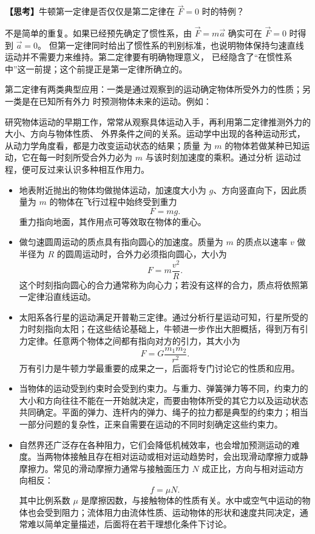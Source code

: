 \noindent\textbf{【思考】}牛顿第一定律是否仅仅是第二定律在 $\vec F=0$ 时的特例？

\begin{thinkanswer}
不是简单的重复。如果已经预先确定了惯性系，由 $\vec F=m\vec a$ 确实可在 $\vec F=0$ 时得到 $\vec a=0$。
但第一定律同时给出了惯性系的判别标准，也说明物体保持匀速直线运动并不需要力来维持。第二定律要有明确物理意义，
已经隐含了“在惯性系中”这一前提；这个前提正是第一定律所确立的。
\end{thinkanswer}

第二定律有两类典型应用：一类是通过观察到的运动确定物体所受外力的性质；另一类是在已知所有外力
时预测物体未来的运动。例如：

研究物体运动的早期工作，常常从观察具体运动入手，再利用第二定律推测外力的大小、方向与物体性质、
外界条件之间的关系。运动学中出现的各种运动形式，从动力学角度看，都是力改变运动状态的结果；质量
为 $m$ 的物体若做某种已知运动，它在每一时刻所受合外力必为 $m$ 与该时刻加速度的乘积。通过分析
运动过程，便可反过来认识多种相互作用力。
\begin{itemize}
  \item 地表附近抛出的物体均做抛体运动，加速度大小为 $g$、方向竖直向下，因此质量为 $m$ 的物体在飞行过程中始终受到重力
  \begin{equation}
    F=mg.
  \end{equation}
  重力指向地面，其作用点可等效取在物体的重心。
  \item 做匀速圆周运动的质点具有指向圆心的加速度。质量为 $m$ 的质点以速率 $v$ 做半径为 $R$ 的圆周运动时，合外力必须指向圆心，大小为
  \begin{equation}
    F=m\frac{v^2}{R}.
  \end{equation}
  这个时刻指向圆心的合力通常称为向心力；若没有这样的合力，质点将依照第一定律沿直线运动。
  \item 太阳系各行星的运动满足开普勒三定律。通过分析行星运动可知，行星所受的力时刻指向太阳；在这些结论基础上，牛顿进一步作出大胆概括，得到万有引力定律。任意两个物体之间都有指向对方的引力，其大小为
  \begin{equation}
    F=G\frac{m_1m_2}{r^2}.
  \end{equation}
  万有引力是牛顿力学最重要的成果之一，后面将专门讨论它的性质和应用。
  \item 当物体的运动受到约束时会受到约束力。与重力、弹簧弹力等不同，约束力的大小和方向往往不能在一开始就决定，而要由物体所受的其它力以及运动状态共同确定。平面的弹力、连杆内的弹力、绳子的拉力都是典型的约束力；相当一部分问题的复杂性，正来自需要在运动的不同时刻确定这些约束力。
  \item 自然界还广泛存在各种阻力，它们会降低机械效率，也会增加预测运动的难度。当两物体接触且存在相对运动或相对运动趋势时，会出现滑动摩擦力或静摩擦力。常见的滑动摩擦力通常与接触面压力 $N$ 成正比，方向与相对运动方向相反：
  \begin{equation}
    f=\mu N.
  \end{equation}
  其中比例系数 $\mu$ 是摩擦因数，与接触物体的性质有关。水中或空气中运动的物体也会受到阻力；流体阻力由流体性质、运动物体的形状和速度共同决定，通常难以简单定量描述，后面将在若干理想化条件下讨论。
\end{itemize}

